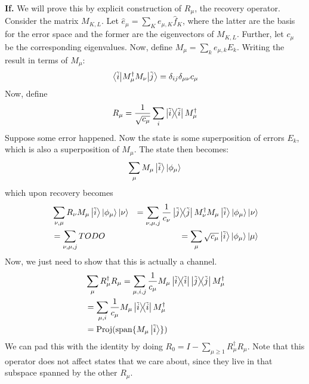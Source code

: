 \begin{theorem}
\begin{proof*}
        \textbf{If.} We will prove this by explicit construction of $R_{\mu}$, the recovery operator. Consider the matrix $M_{K, L}$.
        Let $\hat{e}_{\mu} = \sum_K e_{\mu, K} \hat{f}_K$, where the latter are the basis for the error space and the former
        are the eigenvectors of $M_{K, L}$. Further, let $c_{\mu}$ be the corresponding eigenvalues. Now, define $M_{\mu} = \sum_k e_{\mu, k} E_k$.
        Writing the result in terms of $M_{\mu}$:
        \begin{align*}
            \mel{\tilde{i}}{M_{\mu}^{\dagger} M_{\nu}}{\tilde{j}} = \delta_{ij} \delta_{\mu \nu} c_{\mu}
        \end{align*}
        Now, define
        \[ R_{\mu}  = \frac{1}{\sqrt{c_{\mu}}} \sum_i \ketbra{\tilde{i}} M_{\mu}^{\dagger} \]
        Suppose some error happened. Now the state is some superposition of errors $E_k$, which
        is also a superposition of $M_{\mu}$. The state then becomes:
        \[ \sum_{\mu} M_{\mu} \ket{\tilde{i}} \ket{\phi_{\mu}} \]
        which upon recovery becomes
        \begin{align*}
            &\sum_{\nu, \mu} R_{\nu} M_{\mu} \ket{\tilde{i}} \ket{\phi_{\mu}} \ket{\nu}
            &= \sum_{\nu, \mu, j} \frac{1}{c_{\nu}} \ketbra{\tilde{j}} M_{\nu}^{\dagger} M_{\mu} \ket{\tilde{i}} \ket{\phi_{\mu}} \ket{\nu} \\
            &= \sum_{\nu, \mu, j} TODO
            &= \sum_{\mu} \sqrt{c_{\mu}} \ket{\tilde{i}} \ket{\phi_{\mu}} \ket{\mu}
        \end{align*}
        Now, we just need to show that this is actually a channel.
        \begin{align*}
            &\sum_{\mu} R_{\mu}^{\dagger} R_{\mu}= \sum_{\mu, i, j} \frac{1}{c_{\mu}} M_\mu \ketbra{\tilde{i}} \ketbra{\tilde{j}} M_{\mu}^{\dagger} \\
            &= \sum_{\mu, i} \frac{1}{c_{\mu}} M_{\mu} \ketbra{\tilde{i}} M_{\mu}^{\dagger} \\
            &= \textrm{Proj}(\textrm{span}\{ M_{\mu} \ket{\tilde{i}}\})
        \end{align*}
        We can pad this with the identity by doing $R_0 = I - \sum_{\mu \geq 1} R_{\mu}^{\dagger} R_{\mu}$.
        Note that this operator does not affect states that we care about, since they live in that subspace spanned by the
        other $R_{\mu}$.
    \end{proof*}
\end{theorem}


